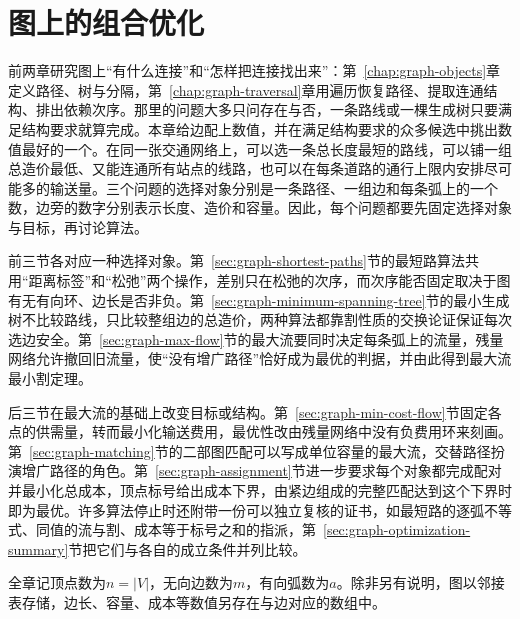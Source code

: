 \chapter{图上的组合优化}
\label{chap:graph-optimization}

前两章研究图上“有什么连接”和“怎样把连接找出来”：第~\ref{chap:graph-objects}章定义路径、树与分隔，第~\ref{chap:graph-traversal}章用遍历恢复路径、提取连通结构、排出依赖次序。那里的问题大多只问存在与否，一条路线或一棵生成树只要满足结构要求就算完成。本章给边配上数值，并在满足结构要求的众多候选中挑出数值最好的一个。在同一张交通网络上，可以选一条总长度最短的路线，可以铺一组总造价最低、又能连通所有站点的线路，也可以在每条道路的通行上限内安排尽可能多的输送量。三个问题的选择对象分别是一条路径、一组边和每条弧上的一个数，边旁的数字分别表示长度、造价和容量。因此，每个问题都要先固定选择对象与目标，再讨论算法。

前三节各对应一种选择对象。第~\ref{sec:graph-shortest-paths}节的最短路算法共用“距离标签”和“松弛”两个操作，差别只在松弛的次序，而次序能否固定取决于图有无有向环、边长是否非负。第~\ref{sec:graph-minimum-spanning-tree}节的最小生成树不比较路线，只比较整组边的总造价，两种算法都靠割性质的交换论证保证每次选边安全。第~\ref{sec:graph-max-flow}节的最大流要同时决定每条弧上的流量，残量网络允许撤回旧流量，使“没有增广路径”恰好成为最优的判据，并由此得到最大流最小割定理。

后三节在最大流的基础上改变目标或结构。第~\ref{sec:graph-min-cost-flow}节固定各点的供需量，转而最小化输送费用，最优性改由残量网络中没有负费用环来刻画。第~\ref{sec:graph-matching}节的二部图匹配可以写成单位容量的最大流，交替路径扮演增广路径的角色。第~\ref{sec:graph-assignment}节进一步要求每个对象都完成配对并最小化总成本，顶点标号给出成本下界，由紧边组成的完整匹配达到这个下界时即为最优。许多算法停止时还附带一份可以独立复核的证书，如最短路的逐弧不等式、同值的流与割、成本等于标号之和的指派，第~\ref{sec:graph-optimization-summary}节把它们与各自的成立条件并列比较。

全章记顶点数为$n=|V|$，无向边数为$m$，有向弧数为$a$。除非另有说明，图以邻接表存储，边长、容量、成本等数值另存在与边对应的数组中。









